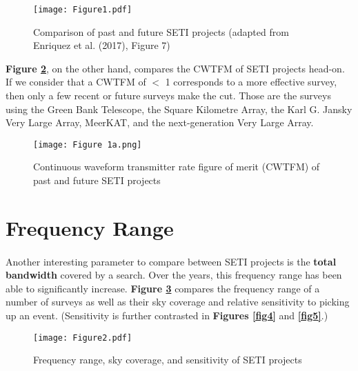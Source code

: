 \documentclass{article}
\begin{document}
\begin{figure}[H]
\begin{center}
\texttt{[image: Figure1.pdf]}
\caption{Comparison of past and future SETI projects (adapted from Enriquez et al. (2017), Figure 7) \textbf{\label{fig1}}}
\end{center}
\end{figure}

\textbf{Figure \ref{fig2}}, on the other hand, compares the CWTFM of SETI projects head-on. If we consider that a CWTFM of $<$ 1 corresponds to a more effective survey, then only a few recent or future surveys make the cut. Those are the surveys using the Green Bank Telescope, the Square Kilometre Array, the Karl G. Jansky Very Large Array, MeerKAT, and the next-generation Very Large Array.

\begin{figure}[H]
\begin{center}
\texttt{[image: Figure 1a.png]}
\caption{Continuous waveform transmitter rate figure of merit (CWTFM) of past and future SETI projects \textbf{\label{fig2}}}
\end{center}
\end{figure}


\section{Frequency Range}

\paragraph{}
Another interesting parameter to compare between SETI projects is the \textbf{total bandwidth} covered by a search. Over the years, this frequency range has been able to significantly increase. \textbf{Figure \ref{fig3}} compares the frequency range of a number of surveys as well as their sky coverage and relative sensitivity to picking up an event. (Sensitivity is further contrasted in \textbf{Figures \ref{fig4}} and \textbf{\ref{fig5}}.)

\begin{figure}[H]
\begin{center}
\texttt{[image: Figure2.pdf]}
\caption{Frequency range, sky coverage, and sensitivity of SETI projects \textbf{\label{fig3}}}
\end{center}
\end{figure}
\end{document}
